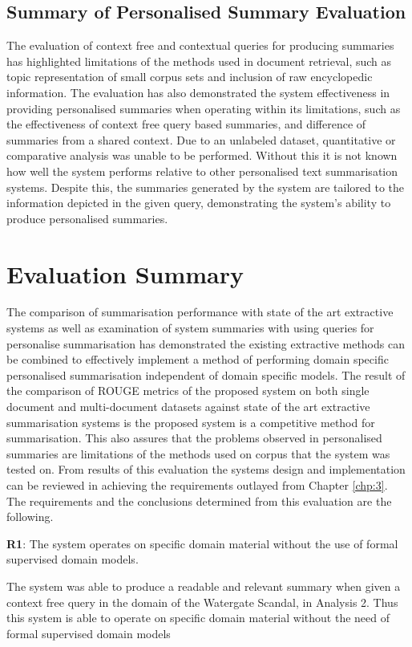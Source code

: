 \subsection{Summary of Personalised Summary Evaluation}
The evaluation of context free and contextual queries for producing summaries has highlighted limitations of  the methods used in document retrieval, such as topic representation of small corpus sets and inclusion of raw encyclopedic information. The evaluation has also demonstrated the system effectiveness in providing personalised summaries when operating within its limitations, such as the effectiveness of context free query based summaries, and difference of summaries from a shared context. Due to an unlabeled dataset, quantitative or comparative analysis was unable to be performed. Without this it is not known how well the system performs relative to other personalised text summarisation systems. Despite this, the summaries generated by the system are tailored to the information depicted in the given query, demonstrating the system's ability to produce personalised summaries.

\section{Evaluation Summary}
The comparison of summarisation performance with state of the art extractive systems as well as examination of system summaries with using queries for personalise summarisation has demonstrated the existing extractive methods can be combined to effectively implement a method of performing domain specific personalised summarisation independent of domain specific models. The result of the comparison of ROUGE metrics of the proposed system on both single document and multi-document datasets against state of the art extractive summarisation systems is the proposed system is a competitive method for summarisation. This also assures that the problems observed in personalised summaries are limitations of the methods used on corpus that the system was tested on. From results of this evaluation the systems design and implementation can be reviewed in achieving the requirements outlayed from Chapter \ref{chp:3}. The requirements and the conclusions determined from this evaluation are the following.

\textbf{R1}: The system operates on specific domain material without the use of formal supervised domain models.

The system was able to produce a readable and relevant summary when given a context free query in the domain of the Watergate Scandal, in Analysis 2. Thus this system is able to operate on specific domain material without the need of formal supervised domain models

